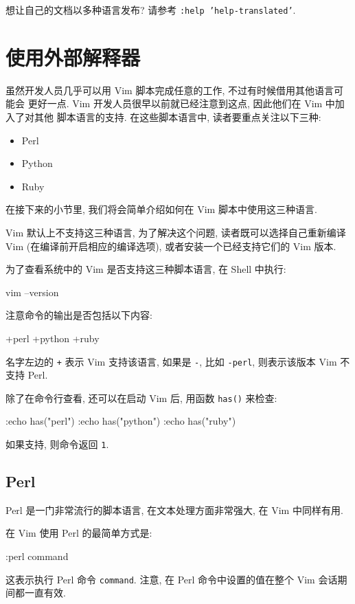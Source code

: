 \begin{warning}
	想让自己的文档以多种语言发布? 请参考 \texttt{:help 'help-translated'}.
\end{warning}

\section{使用外部解释器}
\label{sec:using_external_interpreters}

虽然开发人员几乎可以用 Vim 脚本完成任意的工作, 不过有时候借用其他语言可能会
更好一点. Vim 开发人员很早以前就已经注意到这点, 因此他们在 Vim 中加入了对其他
脚本语言的支持. 在这些脚本语言中, 读者要重点关注以下三种:
\begin{itemize}
	\item Perl
	\item Python
	\item Ruby
\end{itemize}
在接下来的小节里, 我们将会简单介绍如何在 Vim 脚本中使用这三种语言.

Vim 默认上不支持这三种语言, 为了解决这个问题, 读者既可以选择自己重新编译
Vim (在编译前开启相应的编译选项), 或者安装一个已经支持它们的 Vim 版本.

为了查看系统中的 Vim 是否支持这三种脚本语言, 在 Shell 中执行:
\begin{vimcode}
vim --version
\end{vimcode}
注意命令的输出是否包括以下内容:
\begin{vimcode}
+perl
+python
+ruby
\end{vimcode}
名字左边的 \texttt{+} 表示 Vim 支持该语言, 如果是 \texttt{-}, 比如
\texttt{-perl}, 则表示该版本 Vim 不支持 Perl.

除了在命令行查看, 还可以在启动 Vim 后, 用函数 \texttt{has()} 来检查:
\begin{vimcode}
:echo has("perl")
:echo has("python")
:echo has("ruby")
\end{vimcode}
如果支持, 则命令返回 \texttt{1}.

\subsection{Perl}
\label{subsec:vim_script}

Perl 是一门非常流行的脚本语言, 在文本处理方面非常强大, 在 Vim 中同样有用.

在 Vim 使用 Perl 的最简单方式是:
\begin{vimcode}
:perl command
\end{vimcode}
这表示执行 Perl 命令 \texttt{command}. 注意, 在 Perl 命令中设置的值在整个
Vim 会话期间都一直有效.

